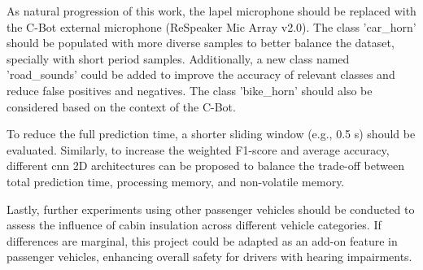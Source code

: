 As natural progression of this work, the lapel microphone should be replaced with the C-Bot external microphone (ReSpeaker Mic Array v2.0). The class 'car\_horn' should be populated with more diverse samples to better balance the dataset, specially with short period samples. Additionally, a new class named 'road\_sounds' could be added to improve the accuracy of relevant classes and reduce false positives and negatives. The class 'bike\_horn' should also be considered based on the context of the C-Bot.

To reduce the full prediction time, a shorter sliding window (e.g., 0.5 \gls{s}) should be evaluated. Similarly, to increase the weighted F1-score and average accuracy, different \gls{cnn} 2D architectures can be proposed to balance the trade-off between total prediction time, processing memory, and non-volatile memory.

Lastly, further experiments using other passenger vehicles should be conducted to assess the influence of cabin insulation across different vehicle categories. If differences are marginal, this project could be adapted as an add-on feature in passenger vehicles, enhancing overall safety for drivers with hearing impairments.